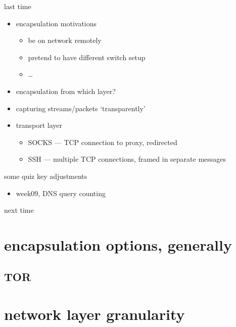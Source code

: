 \date{}
\title{}
\date{}

\begin{frame}
    \titlepage
\end{frame}

\begin{frame}{last time}
    \begin{itemize}
    \item encapsulation motivations
        \begin{itemize}
        \item be on network remotely
        \item pretend to have different switch setup
        \item \ldots
        \end{itemize}
    \item encapsulation from which layer?
    \item capturing streams/packets `transparently'
    \item transport layer
        \begin{itemize}
        \item SOCKS --- TCP connection to proxy, redirected
        \item SSH --- multiple TCP connections, framed in separate messages
        \end{itemize}
    \end{itemize}
\end{frame}

\begin{frame}{some quiz key adjustments}
    \begin{itemize}
    \item week09, DNS query counting
    \end{itemize}
\end{frame}

\begin{frame}{next time}
\end{frame}

\section{encapsulation options, generally}


\subsection{TOR}

\section{network layer granularity}

